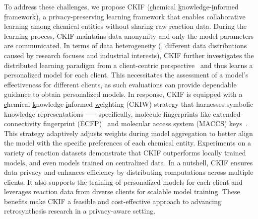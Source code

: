 To address these challenges, we propose CKIF (\underline{c}hemical \underline{k}nowledge-\underline{i}nformed \underline{f}ramework), a privacy-preserving learning framework that enables collaborative learning among chemical entities without sharing raw reaction data. During the learning process, CKIF maintains data anonymity and only the model parameters are communicated. In terms of data heterogeneity (\eg, different data distributions caused by research focuses and industrial interests), CKIF further investigates the distributed learning paradigm from a client-centric perspective~\citep{wang2019federated,huang2021personalized} and thus learns a personalized model for each client. This necessitates the assessment of a model's effectiveness for different clients, as such evaluations can provide dependable guidance to obtain personalized models. In response, CKIF is equipped with a \underline{c}hemical \underline{k}nowledge-\underline{i}nformed \underline{w}eighting (CKIW) strategy that harnesses symbolic knowledge representations —-- specifically, molecule fingerprints like extended-connectivity fingerprint (ECFP)~\citep{rogers2010extended} and molecular access system (MACCS) keys~\citep{durant2002reoptimization}. This strategy adaptively adjusts weights during model aggregation to better align the model with the specific preferences of each chemical entity. Experiments on a variety of reaction datasets demonstrate that CKIF outperforms locally trained models, and even models trained on centralized data. In a nutshell, CKIF ensures data privacy and enhances efficiency by distributing computations across multiple clients. It also supports the training of personalized models for each client and leverages reaction data from diverse clients for scalable model training. These benefits make CKIF a feasible and cost-effective approach to advancing retrosynthesis research in a privacy-aware setting.


 


